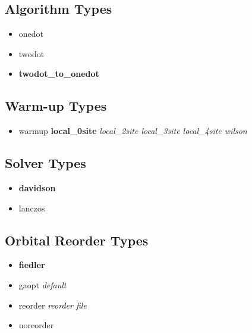 \documentclass[letterpaper,10pt,english]{sphinxmanual}
\begin{document}
\subsection{Algorithm Types}
\label{keywords:algorithm-types}\begin{itemize}
\item {} 
onedot

\item {} 
twodot

\item {} 
\textbf{twodot\_to\_onedot}

\end{itemize}


\subsection{Warm-up Types}
\label{keywords:warm-up-types}\begin{itemize}
\item {} 
warmup \textbf{local\_0site} \emph{\textbar{}\textbar{} local\_2site \textbar{}\textbar{} local\_3site \textbar{}\textbar{} local\_4site \textbar{}\textbar{} wilson}

\end{itemize}


\subsection{Solver Types}
\label{keywords:solver-types}\begin{itemize}
\item {} 
\textbf{davidson}

\item {} 
lanczos

\end{itemize}


\subsection{Orbital Reorder Types}
\label{keywords:orbital-reorder-types}\begin{itemize}
\item {} 
\textbf{fiedler}

\item {} 
gaopt \emph{default}

\item {} 
reorder  \emph{reorder file}

\item {} 
noreorder

\end{itemize}
\end{document}
